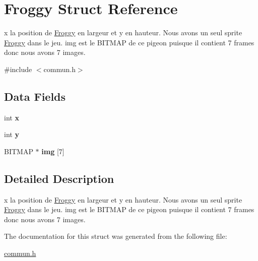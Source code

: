 \hypertarget{struct_froggy}{\section{Froggy Struct Reference}
\label{struct_froggy}
}


x la position de \hyperlink{struct_froggy}{Froggy} en largeur et y en hauteur. Nous avons un seul sprite \hyperlink{struct_froggy}{Froggy} dans le jeu. img est le B\-I\-T\-M\-A\-P de ce pigeon puisque il contient 7 frames donc nous avons 7 images.  




{\ttfamily \#include $<$commun.\-h$>$}

\subsection*{Data Fields}
\begin{DoxyCompactItemize}
\item 
\hypertarget{struct_froggy_a6150e0515f7202e2fb518f7206ed97dc}{int {\bfseries x}}\label{struct_froggy_a6150e0515f7202e2fb518f7206ed97dc}

\item 
\hypertarget{struct_froggy_a0a2f84ed7838f07779ae24c5a9086d33}{int {\bfseries y}}\label{struct_froggy_a0a2f84ed7838f07779ae24c5a9086d33}

\item 
\hypertarget{struct_froggy_ab6b4c00f9aaa715f23d59ed627e5a92d}{B\-I\-T\-M\-A\-P $\ast$ {\bfseries img} \mbox{[}7\mbox{]}}\label{struct_froggy_ab6b4c00f9aaa715f23d59ed627e5a92d}

\end{DoxyCompactItemize}


\subsection{Detailed Description}
x la position de \hyperlink{struct_froggy}{Froggy} en largeur et y en hauteur. Nous avons un seul sprite \hyperlink{struct_froggy}{Froggy} dans le jeu. img est le B\-I\-T\-M\-A\-P de ce pigeon puisque il contient 7 frames donc nous avons 7 images. 


\begin{DoxyItemize}
\item 
\end{DoxyItemize}

The documentation for this struct was generated from the following file\-:\begin{DoxyCompactItemize}
\item 
\hyperlink{commun_8h}{commun.\-h}\end{DoxyCompactItemize}
